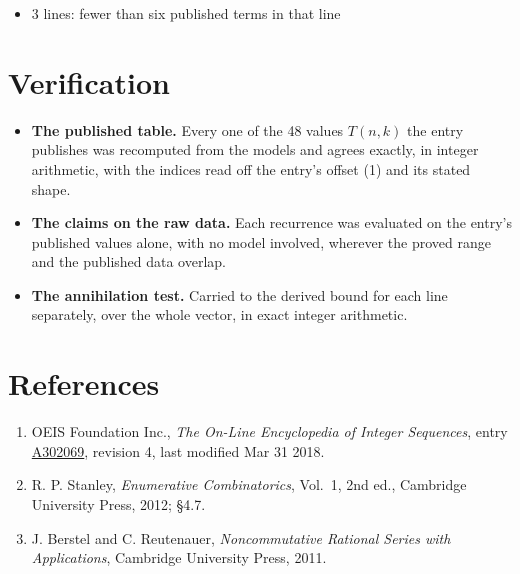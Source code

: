 \documentclass[11pt]{article}
\theoremstyle{definition}
\begin{document}
\begin{itemize}

\item 3 lines: fewer than six published terms in that line

\end{itemize}

\section{Verification}

\begin{itemize}

\item {\bfseries The published table.} Every one of the 48 values $T(n,k)$ the entry publishes was recomputed from the models and agrees exactly, in integer arithmetic, with the indices read off the entry's offset (1) and its stated shape.

\item {\bfseries The claims on the raw data.} Each recurrence was evaluated on the entry's published values alone, with no model involved, wherever the proved range and the published data overlap.

\item {\bfseries The annihilation test.} Carried to the derived bound for each line separately, over the whole vector, in exact integer arithmetic.

\end{itemize}

\section{References}

\begin{enumerate}

\item OEIS Foundation Inc., \emph{The On-Line Encyclopedia of Integer Sequences}, entry \href{https://oeis.org/A302069}{A302069}, revision 4, last modified Mar 31 2018.

\item R. P. Stanley, \emph{Enumerative Combinatorics}, Vol.~1, 2nd ed., Cambridge University Press, 2012; \S4.7.

\item J. Berstel and C. Reutenauer, \emph{Noncommutative Rational Series with Applications}, Cambridge University Press, 2011.

\end{enumerate}
\end{document}
